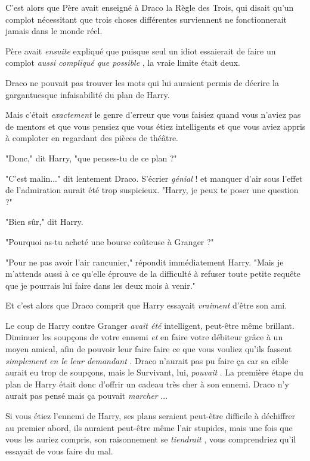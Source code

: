C'est alors que Père avait enseigné à Draco la Règle des Trois, qui disait qu'un complot nécessitant que trois choses différentes surviennent ne fonctionnerait jamais dans le monde réel.

Père avait \emph{ensuite}  expliqué que puisque seul un idiot essaierait de faire un complot \emph{aussi compliqué que possible} , la vraie limite était deux.

Draco ne pouvait pas trouver les mots qui lui auraient permis de décrire la gargantuesque infaisabilité du plan de Harry.

Mais c'était \emph{exactement}  le genre d'erreur que vous faisiez quand vous n'aviez pas de mentors et que vous pensiez que vous étiez intelligents et que vous aviez appris à comploter en regardant des pièces de théâtre.

"Donc," dit Harry, "que penses-tu de ce plan ?"

"C'est malin..." dit lentement Draco. S'écrier \emph{génial}  ! et manquer d'air sous l'effet de l'admiration aurait été trop suspicieux. "Harry, je peux te poser une question ?"

"Bien sûr," dit Harry.

"Pourquoi as-tu acheté une bourse coûteuse à Granger ?"

"Pour ne pas avoir l'air rancunier," répondit immédiatement Harry. "Mais je m'attends aussi à ce qu'elle éprouve de la difficulté à refuser toute petite requête que je pourrais lui faire dans les deux mois à venir."

Et c'est alors que Draco comprit que Harry essayait \emph{vraiment}  d'être son ami.

Le coup de Harry contre Granger \emph{avait été}  intelligent, peut-être même brillant. Diminuer les soupçons de votre ennemi \emph{et}  en faire votre débiteur grâce à un moyen amical, afin de pouvoir leur faire faire ce que vous vouliez qu'ils fassent \emph{simplement en le leur demandant} . Draco n'aurait pas pu faire ça car sa cible aurait eu trop de soupçons, mais le Survivant, lui, \emph{pouvait} . La première étape du plan de Harry était donc d'offrir un cadeau très cher à son ennemi. Draco n'y aurait pas pensé mais ça pouvait \emph{marcher} ...

Si vous étiez l'ennemi de Harry, ses plans seraient peut-être difficile à déchiffrer au premier abord, ils auraient peut-être même l'air stupides, mais une fois que vous les auriez compris, son raisonnement se \emph{tiendrait} , vous comprendriez qu'il essayait de vous faire du mal.

